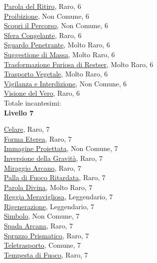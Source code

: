 \begin{multicols}{3}
{{\hyperlink{Parola del Ritiro}{Parola del Ritiro}, Raro, 6\\
\hyperlink{Proibizione}{Proibizione}, Non Comune, 6\\
\hyperlink{Scopri il Percorso}{Scopri il Percorso}, Non Comune, 6\\
\hyperlink{Sfera Congelante}{Sfera Congelante}, Raro, 6\\
\hyperlink{Sguardo Penetrante}{Sguardo Penetrante}, Molto Raro, 6\\
\hyperlink{Suggestione di Massa}{Suggestione di Massa}, Molto Raro, 6\\
\hyperlink{Trasformazione Furiosa di Restser}{Trasformazione Furiosa di Restser}, Molto Raro, 6\\
\hyperlink{Trasporto Vegetale}{Trasporto Vegetale}, Molto Raro, 6\\
\hyperlink{Vigilanza e Interdizione}{Vigilanza e Interdizione}, Non Comune, 6\\
\hyperlink{Visione del Vero}{Visione del Vero}, Raro, 6\\

\medskip Totale incantesimi: \theinclvsei\\

\textbf{Livello 7}

\hyperlink{Celare}{Celare}, Raro, 7\\
\hyperlink{Forma Eterea}{Forma Eterea}, Raro, 7\\
\hyperlink{Immagine Proiettata}{Immagine Proiettata}, Non Comune, 7\\
\hyperlink{Inversione della Gravità}{Inversione della Gravità}, Raro, 7\\
\hyperlink{Miraggio Arcano}{Miraggio Arcano}, Raro, 7\\
\hyperlink{Palla di Fuoco Ritardata}{Palla di Fuoco Ritardata}, Raro, 7\\
\hyperlink{Parola Divina}{Parola Divina}, Molto Raro, 7\\
\hyperlink{Reggia Meravigliosa}{Reggia Meravigliosa}, Leggendario, 7\\
\hyperlink{Rigenerazione}{Rigenerazione}, Leggendario, 7\\
\hyperlink{Simbolo}{Simbolo}, Non Comune, 7\\
\hyperlink{Spada Arcana}{Spada Arcana}, Raro, 7\\
\hyperlink{Spruzzo Prismatico}{Spruzzo Prismatico}, Raro, 7\\
\hyperlink{Teletrasporto}{Teletrasporto}, Comune, 7\\
\hyperlink{Tempesta di Fuoco}{Tempesta di Fuoco}, Raro, 7\\

}}
\end{multicols}
